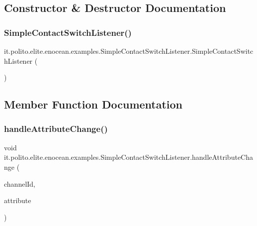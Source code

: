 \subsection{Constructor \& Destructor Documentation}
\hypertarget{classit_1_1polito_1_1elite_1_1enocean_1_1examples_1_1_simple_contact_switch_listener_a98da30e851f987d4f5f10604f7fa8dd7}{}\label{classit_1_1polito_1_1elite_1_1enocean_1_1examples_1_1_simple_contact_switch_listener_a98da30e851f987d4f5f10604f7fa8dd7} 
\subsubsection{\texorpdfstring{Simple\+Contact\+Switch\+Listener()}{SimpleContactSwitchListener()}}
{\footnotesize\ttfamily it.\+polito.\+elite.\+enocean.\+examples.\+Simple\+Contact\+Switch\+Listener.\+Simple\+Contact\+Switch\+Listener (\begin{DoxyParamCaption}{ }\end{DoxyParamCaption})}



\subsection{Member Function Documentation}
\hypertarget{classit_1_1polito_1_1elite_1_1enocean_1_1examples_1_1_simple_contact_switch_listener_a232992168bed46ed042de644aa1caf8f}{}\label{classit_1_1polito_1_1elite_1_1enocean_1_1examples_1_1_simple_contact_switch_listener_a232992168bed46ed042de644aa1caf8f} 
\subsubsection{\texorpdfstring{handle\+Attribute\+Change()}{handleAttributeChange()}}
{\footnotesize\ttfamily void it.\+polito.\+elite.\+enocean.\+examples.\+Simple\+Contact\+Switch\+Listener.\+handle\+Attribute\+Change (\begin{DoxyParamCaption}\item[{int}]{channel\+Id,  }\item[{\hyperlink{classit_1_1polito_1_1elite_1_1enocean_1_1enj_1_1eep_1_1_e_e_p_attribute}{E\+E\+P\+Attribute}$<$?$>$}]{attribute }\end{DoxyParamCaption})}

